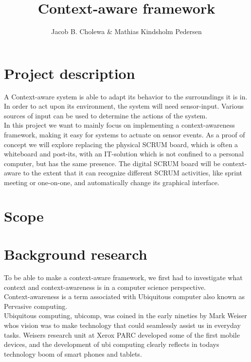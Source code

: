 \documentclass[]{report}
\title{Context-aware framework}
\author{Jacob B. Cholewa \& Mathias Kindsholm Pedersen}
\begin{document}
\maketitle

\begin{abstract}
\end{abstract}


\chapter{Project description}
A Context-aware system is able to adapt its behavior to the surroundings it is in. In order to act upon its environment, the system will need sensor-input. Various sources of input can be used to determine the actions of the system.\\

In this project we want to mainly focus on implementing a context-awareness framework, making it easy for systems to actuate on sensor events. As a proof of concept we will explore replacing the physical SCRUM board, which is often a whiteboard and post-its, with an IT-solution which is not confined to a personal computer, but has the same presence. The digital SCRUM board will be context-aware to the extent that it can recognize different SCRUM activities, like sprint meeting or one-on-one, and automatically change its graphical interface.
\chapter{Scope}
\chapter{Background research}


To be able to make a context-aware framework, we first had to investigate what context and context-awareness is in a computer science perspective.\\

Context-awareness is a term associated with Ubiquitous computer also known as Pervasive computing.\\

Ubiquitous computing, ubicomp, was coined in the early nineties by Mark Weiser whos vision was to make technology that could seamlessly assist us in everyday tasks. Weisers research unit at Xerox PARC developed some of the first mobile devices, and the development of ubi computing clearly reflects in todays technology boom of smart phones and tablets.\\
\end{document}
